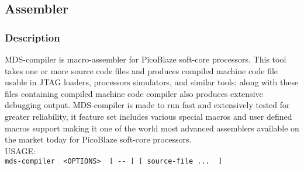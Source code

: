     \subsection{Assembler}
        \subsubsection{Description}
        MDS-compiler is macro-assembler for PicoBlaze soft-core processors. This tool takes one or more source code files and produces compiled machine code file usable in JTAG loaders, processors
        simulators, and similar tools; along with these files containing compiled machine code compiler also produces extensive debugging
        output. MDS-compiler is made to run fast and extensively tested for greater reliability, it feature set includes various special
        macros and user defined macros support making it one of the world most advanced assemblers available on the market today for PicoBlaze
        soft-core processors.\\

        USAGE:
        {
            ~\\
            \usecodefont
            \verb'mds-compiler  <OPTIONS>  [ -- ] [ source-file ...  ]'\\
        }
